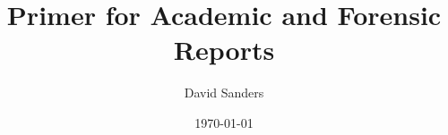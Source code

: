 \documentclass[12pt]{article}
\title{Primer for Academic and Forensic Reports}
\author{David Sanders}
\date{\today}
\begin{document}

\tableofcontents

\pagebreak
\listoffigures

\pagebreak
\listoflistings



\end{document}
